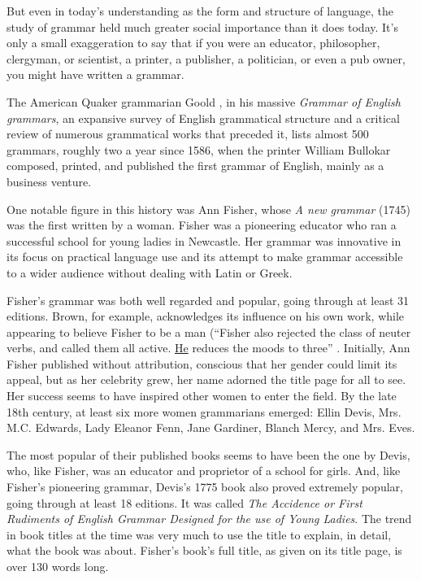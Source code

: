 But even in today's understanding as the form and structure of language, the study of grammar held much greater social importance than it does today. It's only a small exaggeration to say that if you were an educator, philosopher, clergyman, or scientist, a printer, a publisher, a politician, or even a pub owner, you might have written a grammar. 

The American Quaker grammarian Goold \citet{brown_grammar_grammars}, in his massive \textit{Grammar of English grammars}, an expansive survey of English grammatical structure and a critical review of numerous grammatical works that preceded it, lists almost 500 grammars, roughly two a year since 1586, when the printer William Bullokar composed, printed, and published the first grammar of English, mainly as a business venture.

\bigskip

One notable figure in this history was Ann Fisher, whose \textit{A new grammar} (1745) was the first written by a woman. Fisher was a pioneering educator who ran a successful school for young ladies in Newcastle. Her grammar was innovative in its focus on practical language use and its attempt to make grammar accessible to a wider audience without dealing with Latin or Greek.

Fisher's grammar was both well regarded and popular, going through at least 31 editions. Brown, for example, acknowledges its influence on his own work, while appearing to believe Fisher to be a man (``Fisher also rejected the class of neuter verbs, and called them all active. \uline{He} reduces the moods to three'' \citep[138]{brown_grammar_grammars}. Initially, Ann Fisher published without attribution, conscious that her gender could limit its appeal, but as her celebrity grew, her name adorned the title page for all to see. Her success seems to have inspired other women to enter the field. By the late 18th century, at least six more women grammarians emerged: Ellin Devis, Mrs. M.C. Edwards, Lady Eleanor Fenn, Jane Gardiner, Blanch Mercy, and Mrs. Eves.

The most popular of their published books seems to have been the one by Devis, who, like Fisher, was an educator and proprietor of a school for girls. And, like Fisher's pioneering grammar, Devis's 1775 book also proved extremely popular, going through at least 18 editions. It was called \textit{The Accidence or First Rudiments of English Grammar Designed for the use of Young Ladies}. The trend in book titles at the time was very much to use the title to explain, in detail, what the book was about. Fisher's book's full title, as given on its title page, is over 130 words long. 

